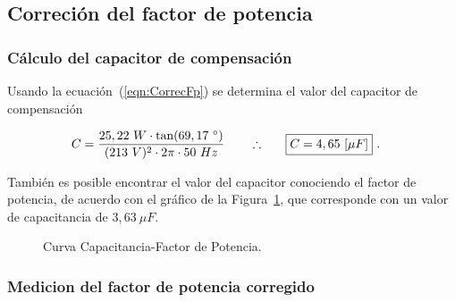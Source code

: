   \subsection{Correción del factor de potencia}
    \subsubsection{Cálculo del capacitor de compensación}
      
       Usando la ecuación~(\ref{eqn:CorrecFp}) se determina el valor del capacitor de compensación

      \begin{align*}
        C = \frac{25,22~W \cdot \tan(69,17~^{\circ} )}{(213~V)^2 \cdot 2  \pi \cdot 50~Hz }  \hspace{20pt} \therefore \hspace{20pt} \Aboxed{C = 4,65~[\mu F]}~.
      \end{align*}

        También es posible encontrar el valor del capacitor conociendo el factor de potencia, de acuerdo
        con el gráfico de la Figura~\ref{fig: Curva Cap_FDP}, que corresponde con un valor de capacitancia de $3,63~\mu F$. 

        \begin{figure}[H]
          \centering
            \caption{Curva Capacitancia-Factor de Potencia.}
            \label{fig: Curva Cap_FDP}
        \end{figure}

        

    \subsubsection{Medicion del factor de potencia corregido}

